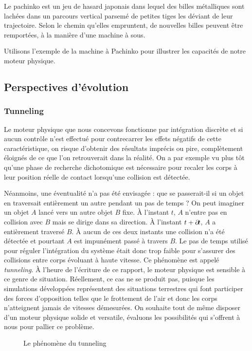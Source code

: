 Le pachinko est un jeu de hasard japonais dans lequel des billes
métalliques sont lachées dans un parcours vertical parsemé de petites
tiges les déviant de leur trajectoire. Selon le chemin qu'elles
empruntent, de nouvelles billes peuvent être remportées, à la manière
d'une machine à sous.

Utilisons l'exemple de la machine à Pachinko pour illustrer les
capacités de notre moteur physique.

\subsection{Perspectives d'évolution}

\subsubsection{Tunneling}

Le moteur physique que nous concevons fonctionne par intégration
discrète et si aucun contrôle n'est effectué pour contrecarrer les
effets négatifs de cette caractéristique, on risque d'obtenir des
résultats imprécis ou pire, complètement éloignés de ce que l'on
retrouverait dans la réalité. On a par exemple vu plus tôt qu'une
phase de recherche dichotomique est nécessaire pour recaler les corps
à leur position réelle de contact lorsqu'une collision est détectée.

Néanmoins, une éventualité n'a pas été envisagée : que se passerait-il
si un objet en traversait entièrement un autre pendant un pas de temps
? On peut imaginer un objet $A$ lancé vers un autre objet $B$
fixe. \`A l'instant $t$, $A$ n'entre pas en collision avec $B$ mais se
dirige dans sa direction. \`A l'instant $t + \partial \! t$, $A$ a
entièrement traversé $B$. \`A aucun de ces deux instants une collision
n'a été détectée et pourtant $A$ est impunément passé à travers
$B$. Le pas de temps utilisé pour réguler l'intégration du système
était donc trop faible pour s'assurer des collisions entre corps
évoluant à haute vitesse. Ce phénomène est appelé
\textit{tunneling}. \`A l'heure de l'écriture de ce rapport, le moteur
physique est sensible à ce genre de situation. Réellement, ce cas ne
se produit pas, puisque les simulations développées représentent des
situations terrestres qui font participer des forces d'opposition
telles que le frottement de l'air et donc les corps n'atteignent
jamais de vitesses démesurées. On souhaite tout de même disposer d'un
moteur physique solide et versatile, évaluons les possibilités qui
s'offrent à nous pour pallier ce problème.
\begin{figure}
  \centering
  
  \caption{Le phénomène du tunneling}
  \label{tunneling1}
\end{figure}

